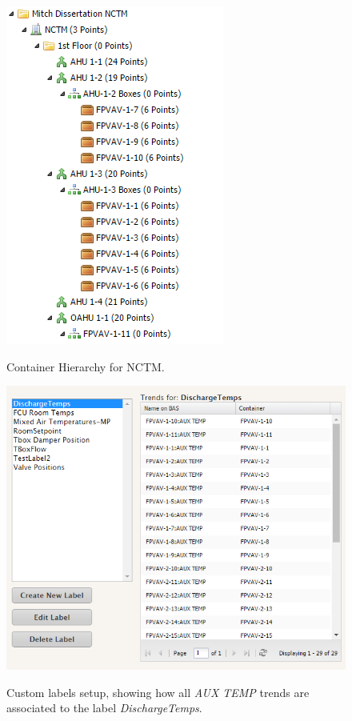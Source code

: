 \begin{figure}
\centering
\includegraphics{Images/ContainerHierarchy.PNG}
\label{fig:ContainerHierarchy}
\caption{Container Hierarchy for NCTM.}
\end{figure}


\begin{figure}
\centering
\includegraphics[scale=0.75]{Images/CustomLabels.PNG}
\label{fig:CustomLabels}
\caption{Custom labels setup, showing how all \textit{AUX TEMP} trends
are associated to the label \textit{DischargeTemps}. }
\end{figure}

